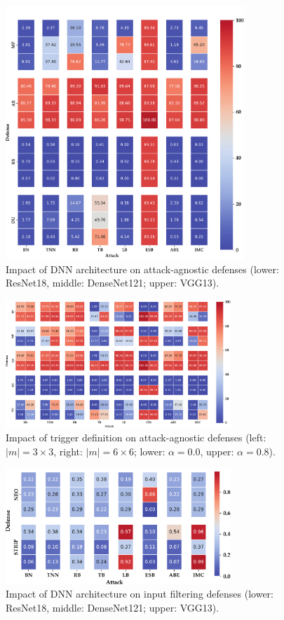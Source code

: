 \documentclass[compsoc,conference,a4paper,10pt,times]{IEEEtran}
\begin{document}
\begin{figure}[!ht]
    \centering
    \includegraphics[width=90mm]{figures/defense/defense-model-general.pdf}
    \caption{Impact of DNN architecture on attack-agnostic defenses (lower:  ResNet18, middle:  DenseNet121; upper:  VGG13).}
    \label{fig:defense-model-general}
\end{figure}

\begin{figure}[!ht]
    \centering
    \includegraphics[width=85mm]{figures/defense/defense-trigger-general.pdf}
    \caption{Impact of trigger definition on attack-agnostic defenses (left:  $|m|=3\times3$, right:  $|m|=6\times6$; lower:  $\alpha=0.0$, upper:  $\alpha=0.8$).}
    \label{fig:defense-trigger-general}
\end{figure}


\begin{figure}[!ht]
    \centering
    \includegraphics[width=85mm]{figures/defense/defense-model-inference.pdf}
    \caption{Impact of DNN architecture on input filtering defenses (lower:  ResNet18, middle:  DenseNet121; upper:  VGG13).}
    \label{fig:defense-model-inference}
\end{figure}
\end{document}
